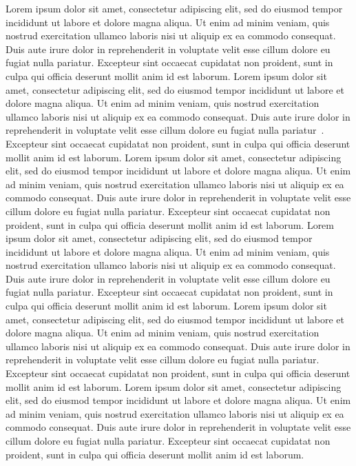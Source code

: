 \documentclass[letterpaper, 10 pt, conference]{ieeeconf}  %
\begin{document}
Lorem ipsum dolor sit amet, consectetur adipiscing elit, sed do eiusmod tempor incididunt ut labore et dolore magna aliqua. Ut enim ad minim veniam, quis nostrud exercitation ullamco laboris nisi ut aliquip ex ea commodo consequat. Duis aute irure dolor in reprehenderit in voluptate velit esse cillum dolore eu fugiat nulla pariatur. Excepteur sint occaecat cupidatat non proident, sunt in culpa qui officia deserunt mollit anim id est laborum. Lorem ipsum dolor sit amet, consectetur adipiscing elit, sed do eiusmod tempor incididunt ut labore et dolore magna aliqua. Ut enim ad minim veniam, quis nostrud exercitation ullamco laboris nisi ut aliquip ex ea commodo consequat. Duis aute irure dolor in reprehenderit in voluptate velit esse cillum dolore eu fugiat nulla pariatur~\cite{Perarson2017478-491}. Excepteur sint occaecat cupidatat non proident, sunt in culpa qui officia deserunt mollit anim id est laborum. Lorem ipsum dolor sit amet, consectetur adipiscing elit, sed do eiusmod tempor incididunt ut labore et dolore magna aliqua. Ut enim ad minim veniam, quis nostrud exercitation ullamco laboris nisi ut aliquip ex ea commodo consequat. Duis aute irure dolor in reprehenderit in voluptate velit esse cillum dolore eu fugiat nulla pariatur. Excepteur sint occaecat cupidatat non proident, sunt in culpa qui officia deserunt mollit anim id est laborum. Lorem ipsum dolor sit amet, consectetur adipiscing elit, sed do eiusmod tempor incididunt ut labore et dolore magna aliqua. Ut enim ad minim veniam, quis nostrud exercitation ullamco laboris nisi ut aliquip ex ea commodo consequat. Duis aute irure dolor in reprehenderit in voluptate velit esse cillum dolore eu fugiat nulla pariatur. Excepteur sint occaecat cupidatat non proident, sunt in culpa qui officia deserunt mollit anim id est laborum. Lorem ipsum dolor sit amet, consectetur adipiscing elit, sed do eiusmod tempor incididunt ut labore et dolore magna aliqua. Ut enim ad minim veniam, quis nostrud exercitation ullamco laboris nisi ut aliquip ex ea commodo consequat. Duis aute irure dolor in reprehenderit in voluptate velit esse cillum dolore eu fugiat nulla pariatur. Excepteur sint occaecat cupidatat non proident, sunt in culpa qui officia deserunt mollit anim id est laborum. Lorem ipsum dolor sit amet, consectetur adipiscing elit, sed do eiusmod tempor incididunt ut labore et dolore magna aliqua. Ut enim ad minim veniam, quis nostrud exercitation ullamco laboris nisi ut aliquip ex ea commodo consequat. Duis aute irure dolor in reprehenderit in voluptate velit esse cillum dolore eu fugiat nulla pariatur. Excepteur sint occaecat cupidatat non proident, sunt in culpa qui officia deserunt mollit anim id est laborum.
\end{document}
